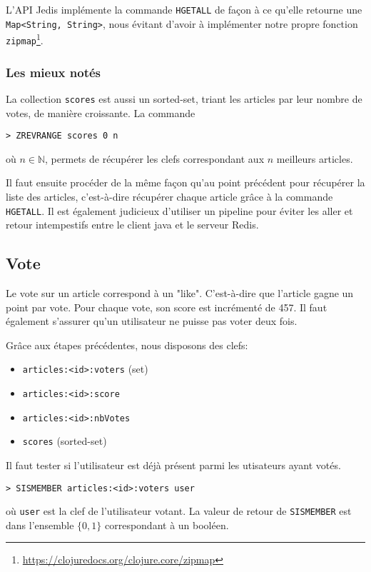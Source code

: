 \documentclass[article,a4paper,12pt]{article}
\begin{document}
L'API Jedis implémente la commande \texttt{HGETALL} de façon à ce qu'elle retourne
une \texttt{Map<String, String>}, nous évitant d'avoir à implémenter notre propre
fonction \texttt{zipmap}\footnote{\url{https://clojuredocs.org/clojure.core/zipmap}}.

\subsubsection{Les mieux notés}
\label{sec:orgheadline7}

La collection \texttt{scores} est aussi un sorted-set, triant les articles par leur
nombre de votes, de manière croissante. La commande
\begin{verbatim}
> ZREVRANGE scores 0 n
\end{verbatim}
où \(n \in \mathbb{N}\), permets de récupérer les clefs correspondant aux \(n\)
meilleurs articles.

Il faut ensuite procéder de la même façon qu'au point précédent pour récupérer
la liste des articles, c'est-à-dire récupérer chaque article grâce à la
commande \texttt{HGETALL}. Il est également judicieux d'utiliser un pipeline pour
éviter les aller et retour intempestifs entre le client java et le serveur
Redis.

\subsection{Vote}
\label{sec:orgheadline9}
Le vote sur un article correspond à un "like". C'est-à-dire que l'article
gagne un point par vote. Pour chaque vote, son score est incrémenté de 457.
Il faut également s'assurer qu'un utilisateur ne puisse pas voter deux fois.

Grâce aux étapes précédentes, nous disposons des clefs:

\begin{itemize}
\item \texttt{articles:<id>:voters} (set)
\item \texttt{articles:<id>:score}
\item \texttt{articles:<id>:nbVotes}
\item \texttt{scores} (sorted-set)
\end{itemize}

Il faut tester si l'utilisateur est déjà présent parmi les utisateurs ayant votés.

\begin{verbatim}
> SISMEMBER articles:<id>:voters user
\end{verbatim}
où \texttt{user} est la clef de l'utilisateur votant. La valeur de retour de
\texttt{SISMEMBER} est dans l'ensemble \(\{0,1\}\) correspondant à un booléen.
\end{document}
